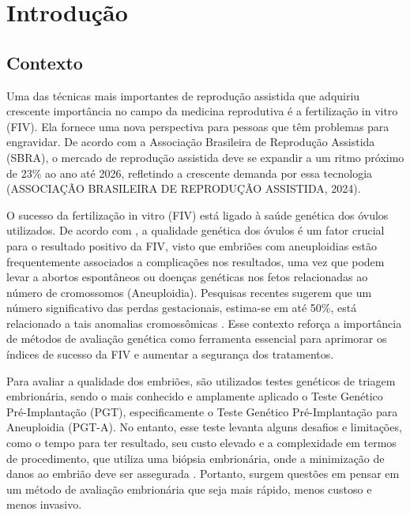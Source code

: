 \chapter[Introdução]{Introdução}

\section{Contexto}

Uma das técnicas mais importantes de reprodução assistida que adquiriu crescente importância no campo da medicina reprodutiva é a fertilização in vitro (FIV). Ela fornece uma nova perspectiva para pessoas que têm problemas para engravidar. De acordo com a Associação Brasileira de Reprodução Assistida (SBRA), o mercado de reprodução assistida deve se expandir a um ritmo próximo de 23\% ao ano até 2026, refletindo a crescente demanda por essa tecnologia (ASSOCIAÇÃO BRASILEIRA DE REPRODUÇÃO ASSISTIDA, 2024).

O sucesso da fertilização in vitro (FIV) está ligado à saúde genética dos óvulos utilizados. De acordo com , a qualidade genética dos óvulos é um fator crucial para o resultado positivo da FIV, visto que embriões com aneuploidias estão frequentemente associados a complicações nos resultados, uma vez que podem levar a abortos espontâneos ou doenças genéticas nos fetos relacionadas ao número de cromossomos (Aneuploidia). Pesquisas recentes sugerem que um número significativo das perdas gestacionais, estima-se em até 50\%, está relacionado a tais anomalias cromossômicas \cite{scienceofbiogenetics2024}. Esse contexto reforça a importância de métodos de avaliação genética como ferramenta essencial para aprimorar os índices de sucesso da FIV e aumentar a segurança dos tratamentos.

Para avaliar a qualidade dos embriões, são utilizados testes genéticos de triagem embrionária, sendo o mais conhecido e amplamente aplicado o Teste Genético Pré-Implantação (PGT), especificamente o Teste Genético Pré-Implantação para Aneuploidia (PGT-A). No entanto, esse teste levanta alguns desafios e limitações, como o tempo para ter resultado, seu custo elevado e a complexidade em termos de procedimento, que utiliza uma biópsia embrionária, onde a minimização de danos ao embrião deve ser assegurada \cite{yang2024}. Portanto, surgem questões em pensar em um método de avaliação embrionária que seja mais rápido,  menos custoso e menos invasivo. 

